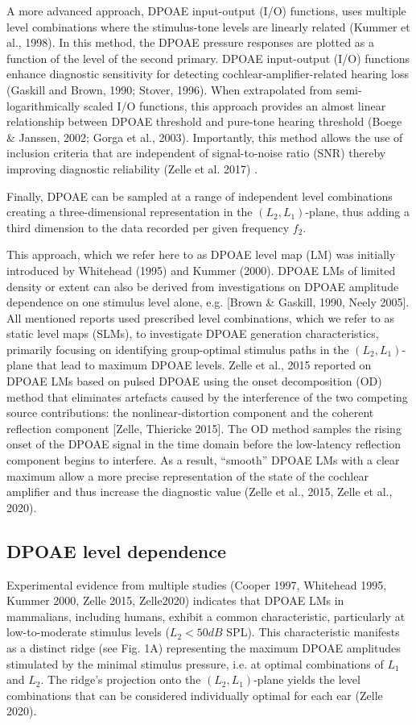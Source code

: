 \documentclass[journal,twoside,web]{ieeecolor2}
\begin{document}
A more advanced approach, DPOAE input-output (I/O) functions, uses multiple level combinations where the stimulus-tone levels are linearly related (Kummer et al., 1998). In this method, the DPOAE pressure responses are plotted as a function of the level of the second primary. DPOAE input-output (I/O) functions enhance diagnostic sensitivity for detecting cochlear-amplifier-related hearing loss (Gaskill and Brown, 1990; Stover, 1996). When extrapolated from semi-logarithmically scaled I/O functions, this approach provides an almost linear relationship between DPOAE threshold and pure-tone hearing threshold (Boege \& Janssen, 2002; Gorga et al., 2003). Importantly, this method allows the use of inclusion criteria that are independent of signal-to-noise ratio (SNR) thereby improving diagnostic reliability (Zelle et al. 2017) .

Finally, DPOAE can be sampled at a range of independent level combinations creating a three-dimensional representation in the $(L_2, L_1)$-plane, thus adding a third dimension to the data recorded per given frequency $f_2$.

This approach, which we refer here to as DPOAE level map (LM) was initially introduced by Whitehead (1995) and Kummer (2000). DPOAE LMs of limited density or extent can also be derived from investigations on DPOAE amplitude dependence on one stimulus level alone, e.g. [Brown \& Gaskill, 1990, Neely 2005]. All mentioned reports used prescribed level combinations, which we refer to as static level maps (SLMs), to investigate DPOAE generation characteristics, primarily focusing on identifying group-optimal stimulus paths in the $(L_2, L_1)$-plane that lead to maximum DPOAE levels. Zelle et al., 2015 reported on DPOAE LMs based on pulsed DPOAE using the onset decomposition (OD) method that eliminates artefacts caused by the interference of the two competing source contributions: the nonlinear-distortion component and the coherent reflection component [Zelle, Thiericke 2015]. The OD method samples the rising onset of the DPOAE signal in the time domain before the low-latency reflection component begins to interfere. As a result, “smooth” DPOAE LMs with a clear maximum allow a more precise representation of the state of the cochlear amplifier and thus increase the diagnostic value (Zelle et al., 2015, Zelle et al., 2020).
 

\subsection{DPOAE level dependence}
Experimental evidence from multiple studies (Cooper 1997, Whitehead 1995, Kummer 2000, Zelle 2015, Zelle2020) indicates that DPOAE LMs in mammalians, including humans, exhibit a common characteristic, particularly at low-to-moderate stimulus levels ($L_2<50 dB$ SPL). This characteristic manifests as a distinct ridge (see Fig. 1A) representing the maximum DPOAE amplitudes stimulated by the minimal stimulus pressure, i.e. at optimal combinations of $L_1$ and $L_2$. The ridge’s projection onto the $(L_2, L_1)$-plane yields the level combinations that can be considered individually optimal for each ear (Zelle 2020).
\end{document}
